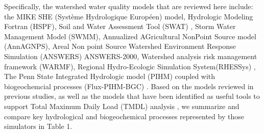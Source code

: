 \documentclass[preprint,review, 12pt]{elsarticle}
\begin{document}
                
 Specifically, the watershed water quality models that are reviewed here include: the MIKE SHE (Système Hydrologique Européen) model\citep{Ma2016, Jaber2012}, Hydrologic Modeling Fortran (HSPF)\citep{Duda2012}, Soil and Water Assessment Tool (SWAT) \citep{Neitsch2011, Arnold1998, Gassman2007}, Storm Water Management Model (SWMM)\citep{Huber2003, Cambez2008, Rossman2010}, Annualized AGricultural NonPoint Source model (AnnAGNPS)\citep{Bingner2018, Yuan2001}, Areal Non point Source Watershed Environment Response Simulation (ANSWERS) ANSWERS-2000\citep{Bouraoui1996}, Watershed analysis risk management framework (WARMF)\citep{Goldstein2001, Herr2012}, Regional Hydro-Ecologic Simulation System(RHESSys) \citep{Tague2004d}, The Penn State Integrated Hydrologic model (PIHM) coupled with biogeochemcial processes (Flux-PIHM-BGC) \citep{Shi2018}. Based on the models reviewed in previous studies, as well as the models that have been identified as useful tools to support Total Maximum Daily Load (TMDL) analysis \citep{Shoemaker2005, US-EPA2019}, we summarize and compare key hydrological and biogeochemical processes represented by those simulators in Table 1. 
\end{document}
